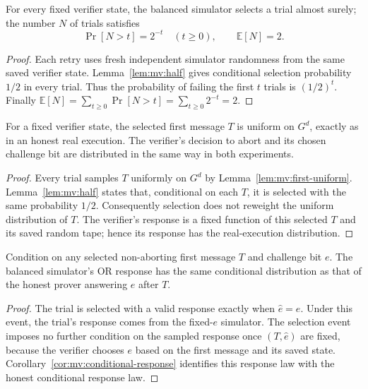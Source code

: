 \begin{lemma}\label{lem:mv:expected-two}
For every fixed verifier state, the balanced
simulator selects a trial almost surely;
the number $N$ of trials satisfies
\[
 \Pr[N>t]=2^{-t}\quad(t\ge0),
 \qquad \mathbb E[N]=2.
\]
\end{lemma}
\begin{proof}
Each retry uses fresh independent simulator
randomness from the same saved verifier state.
Lemma~\ref{lem:mv:half} gives conditional
selection probability $1/2$ in every trial.
Thus the probability of failing the
first $t$ trials is $(1/2)^t$.
Finally
$\mathbb E[N]=\sum_{t\ge0}\Pr[N>t]
=\sum_{t\ge0}2^{-t}=2$.
\end{proof}

\begin{lemma}\label{lem:mv:preserve-first}
For a fixed verifier state, the selected
first message $T$ is uniform on $G^d$,
exactly as in an honest real execution.
The verifier's decision to abort and its
chosen challenge bit are distributed in
the same way in both experiments.
\end{lemma}
\begin{proof}
Every trial samples $T$ uniformly on $G^d$
by Lemma~\ref{lem:mv:first-uniform}.
Lemma~\ref{lem:mv:half} states that,
conditional on each $T$, it is selected
with the same probability $1/2$.
Consequently selection does not reweight
the uniform distribution of $T$.
The verifier's response is a fixed
function of this selected $T$ and its
saved random tape; hence its response
has the real-execution distribution.
\end{proof}

\begin{lemma}\label{lem:mv:real-response}
Condition on any selected non-aborting first
message $T$ and challenge bit $e$.
The balanced simulator's OR response has
the same conditional distribution as that
of the honest prover answering $e$ after $T$.
\end{lemma}
\begin{proof}
The trial is selected with a valid response
exactly when $\widehat e=e$.
Under this event, the trial's response
comes from the fixed-$e$ simulator.
The selection event imposes no further
condition on the sampled response once
$(T,\widehat e)$ are fixed, because
the verifier chooses $e$ based on the
first message and its saved state.
Corollary~\ref{cor:mv:conditional-response}
identifies this response law with
the honest conditional response law.
\end{proof}

